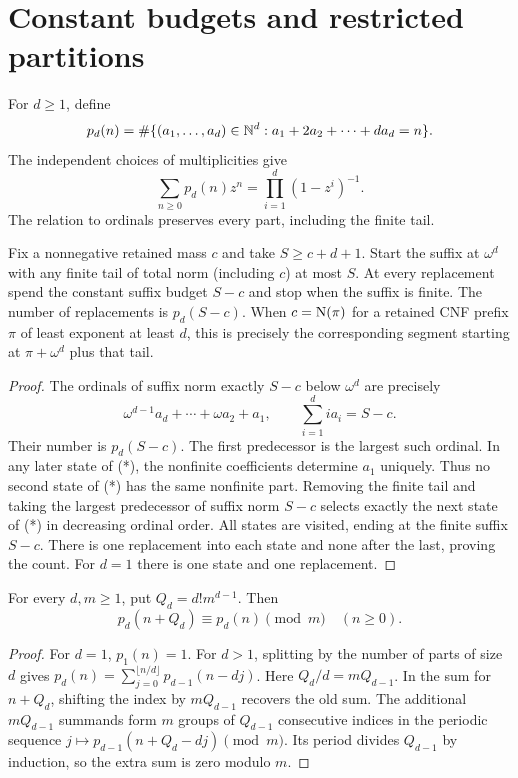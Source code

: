 \section{Constant budgets and restricted partitions}

For $d\ge1$, define
\[
 p_d(n)=\#\{(a_1,\ldots,a_d)\in\mathbb N^d:
                         a_1+2a_2+\cdots+da_d=n\}.
\]
The independent choices of multiplicities give
\begin{equation}\label{eq:partition-series}
 \sum_{n\ge0}p_d(n)z^n=\prod_{i=1}^d(1-z^i)^{-1}.
\end{equation}
The relation to ordinals preserves every part, including the finite tail.

\begin{lemma}\label{lem:fixed}
Fix a nonnegative retained mass $c$ and take $S\ge c+d+1$.
Start the suffix at $\omega^d$ with any finite tail of total norm
(including $c$) at most $S$. At every replacement spend the constant
suffix budget $S-c$ and stop when the suffix is finite. The number of
replacements is $p_d(S-c)$. When $c=\operatorname{N}(\pi)$ for a retained
CNF prefix $\pi$ of least exponent at least $d$, this is precisely
the corresponding segment starting at $\pi+\omega^d$ plus that tail.
\end{lemma}
\begin{proof}
The ordinals of suffix norm exactly $S-c$ below $\omega^d$ are
precisely
\[
 \omega^{d-1}a_d+\cdots+\omega a_2+a_1,\qquad
             \sum_{i=1}^d i a_i=S-c.
 \tag{*}
\]
Their number is $p_d(S-c)$. The first predecessor is the largest
such ordinal. In any later state of (*), the nonfinite coefficients
determine $a_1$ uniquely. Thus no second state of (*) has the same
nonfinite part. Removing the finite tail and taking the largest
predecessor of suffix norm $S-c$ selects exactly the next state of
(*) in decreasing ordinal order. All states are visited, ending at
the finite suffix $S-c$. There is one replacement into each state
and none after the last, proving the count. For $d=1$ there is one
state and one replacement.
\end{proof}

\begin{lemma}\label{lem:period}
For every $d,m\ge1$, put $Q_d=d!m^{d-1}$. Then
\[
             p_d(n+Q_d)\equiv p_d(n)\pmod m\quad(n\ge0).
\]
\end{lemma}
\begin{proof}
For $d=1$, $p_1(n)=1$. For $d>1$, splitting by the number
of parts of size $d$ gives
$p_d(n)=\sum_{j=0}^{\lfloor n/d\rfloor}p_{d-1}(n-dj)$.
Here $Q_d/d=mQ_{d-1}$. In the sum for $n+Q_d$, shifting the
index by $mQ_{d-1}$ recovers the old sum. The additional
$mQ_{d-1}$ summands form $m$ groups of $Q_{d-1}$ consecutive
indices in the periodic sequence
$j\mapsto p_{d-1}(n+Q_d-dj)\pmod m$.
Its period divides $Q_{d-1}$ by induction, so the extra sum is zero
modulo $m$.
\end{proof}


